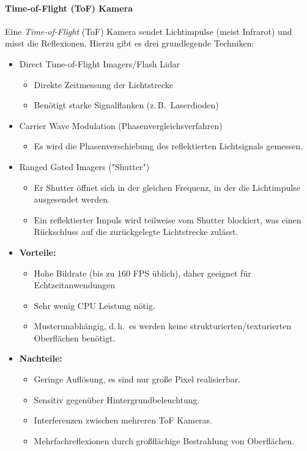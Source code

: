 \documentclass[a4paper, 11pt, accentcolor = tud3b]{tudreport}
\renewcommand{\dh}{d.\,h.~}
\newcommand{\zB}{z.\,B.~}
\begin{document}
					\paragraph{Time-of-Flight (ToF) Kamera}
						Eine \emph{Time-of-Flight} (ToF) Kamera sendet Lichtimpulse (meist Infrarot) und misst die Reflexionen. Hierzu gibt es drei grundlegende Techniken:
						\begin{itemize}
							\item Direct Time-of-Flight Imagers/Flash Lidar
								\begin{itemize}
									\item Direkte Zeitmessung der Lichtstrecke
									\item Benötigt starke Signalflanken (\zB Laserdioden)
								\end{itemize}
							\item Carrier Wave Modulation (Phasenvergleichsverfahren)
								\begin{itemize}
									\item Es wird die Phasenverschiebung des reflektierten Lichtsignals gemessen.
								\end{itemize}
							\item Ranged Gated Imagers ("Shutter")
								\begin{itemize}
									\item Er Shutter öffnet sich in der gleichen Frequenz, in der die Lichtimpulse ausgesendet werden.
									\item Ein reflektierter Impuls wird teilweise vom Shutter blockiert, was einen Rückschluss auf die zurückgelegte Lichtstrecke zulässt.
								\end{itemize}
						\end{itemize}
					
						\begin{itemize}
							\item \textbf{Vorteile:}
								\begin{itemize}
									\item Hohe Bildrate (bis zu \num{160} FPS üblich), daher geeignet für Echtzeitanwendungen
									\item Sehr wenig CPU Leistung nötig.
									\item Musterunabhängig, \dh es werden keine strukturierten/texturierten Oberflächen benötigt.
								\end{itemize}
							\item \textbf{Nachteile:}
								\begin{itemize}
									\item Geringe Auflösung, es sind nur große Pixel realisierbar.
									\item Sensitiv gegenüber Hintergrundbeleuchtung.
									\item Interferenzen zwischen mehreren ToF Kameras.
									\item Mehrfachreflexionen durch großflächige Bestrahlung von Oberflächen.
								\end{itemize}
						\end{itemize}
\end{document}
